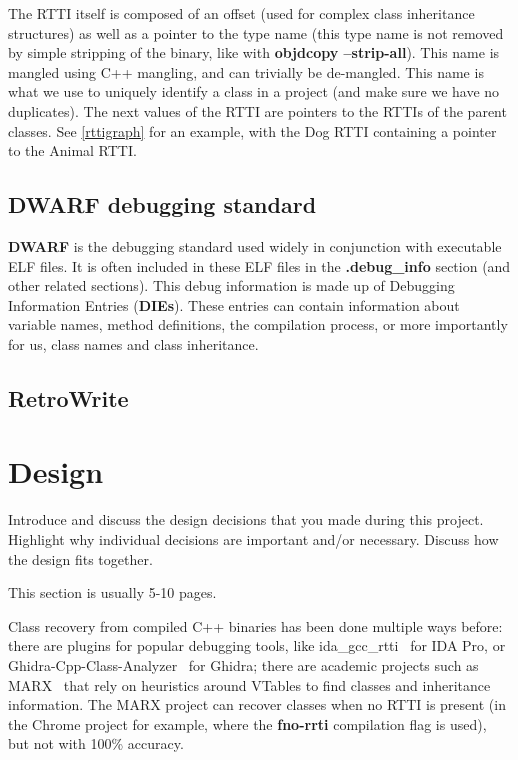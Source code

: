\documentclass[a4paper,11pt,oneside]{report}
\begin{document}
The RTTI itself is composed of an offset (used for complex class inheritance structures) as well as a pointer to the type name (this type name is not removed by simple stripping of the binary, like with \textbf{objdcopy --strip-all}).
This name is mangled using C++ mangling, and can trivially be de-mangled. This name is what we use to uniquely identify a class in a project (and make sure we have no duplicates).
The next values of the RTTI are pointers to the RTTIs of the parent classes. See \autoref{rttigraph} for an example, with the Dog RTTI containing a pointer to the Animal RTTI.

\section{DWARF debugging standard}

\textbf{DWARF} is the debugging standard used widely in conjunction with executable ELF files.
It is often included in these ELF files in the \textbf{.debug\_info} section (and other related sections).
This debug information is made up of Debugging Information Entries (\textbf{DIEs}).
These entries can contain information about variable names, method definitions, the compilation process, or more importantly for us, class names and class inheritance.


\section{RetroWrite}



\chapter{Design}

Introduce and discuss the design decisions that you made during this project.
Highlight why individual decisions are important and/or necessary. Discuss
how the design fits together.

This section is usually 5-10 pages.

Class recovery from compiled C++ binaries has been done multiple ways before:
there are plugins for popular debugging tools, like ida\_gcc\_rtti~\cite{idagccrtti} for IDA Pro,
or Ghidra-Cpp-Class-Analyzer~\cite{ghidracppclassanalyzer} for Ghidra;
there are academic projects such as MARX~\cite{marx} that rely on heuristics around VTables to find classes and inheritance information.
The MARX project can recover classes when no RTTI is present (in the Chrome project for example, where the \textbf{fno-rrti} compilation flag is used), but not with 100\% accuracy.
\end{document}

